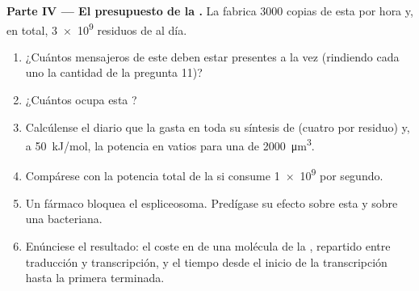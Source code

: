 \begin{problem}
\medskip
\noindent\textbf{Parte IV --- El presupuesto de la .}
La  fabrica \num{3000} copias de esta  por hora y, en total,
\num{3e9} residuos de  al día.
\begin{enumerate}[resume]
  \item ¿Cuántos mensajeros de este  deben estar presentes a la vez
        (rindiendo cada uno la cantidad de la pregunta 11)?
  \item ¿Cuántos  ocupa esta ?
  \item Calcúlense el  diario que la  gasta en toda su síntesis de
         (cuatro por residuo) y, a \qty{50}{kJ/mol}, la potencia
        en vatios para una  de \qty{2000}{\micro m^3}.
  \item Compárese con la potencia total de la  si consume
        \qty{1e9}{}  por segundo.
  \item Un fármaco bloquea el espliceosoma. Predígase su efecto sobre esta
         y sobre una  bacteriana.
  \item Enúnciese el resultado: el coste en  de una molécula de la
        , repartido entre traducción y transcripción, y el tiempo
        desde el inicio de la transcripción hasta la primera 
        terminada.
\end{enumerate}
\end{problem}
